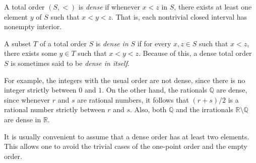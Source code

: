 \documentclass[12pt]{article}
\begin{document}
A total order $(S,<)$ is \emph{dense} if whenever $x < z$ in $S$, there exists at least one element $y$ of $S$ such that $x < y < z$.  That is, each nontrivial closed interval has nonempty interior.

A subset $T$ of a total order $S$ is \emph{dense in} $S$ if for every $x,z\in S$ such that $x<z$, there exists some $y\in T$ such that $x<y<z$.  Because of this, a dense total order $S$ is sometimes said to be \emph{dense in itself}.

For example, the integers with the usual order are not dense, since there is no integer strictly between $0$ and $1$.  On the other hand, the rationals $\mathbb{Q}$ are dense, since whenever $r$ and $s$ are rational numbers, it follows that $(r+s)/2$ is a rational number strictly between $r$ and $s$.  
Also, both $\mathbb{Q}$ and the irrationals $\mathbb{R}\setminus\mathbb{Q}$ are dense in $\mathbb{R}$.

It is usually convenient to assume that a dense order has at least two elements.  This allows one to avoid the trivial cases of the one-point order and the empty order.
\end{document}
